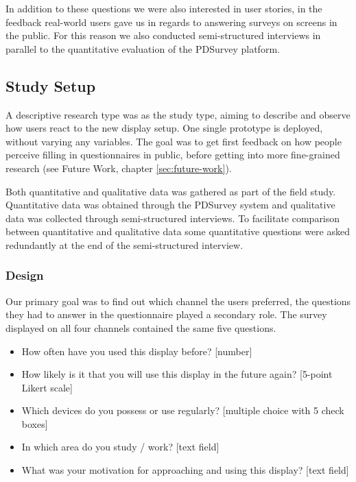 	In addition to these questions we were also interested in user stories, in the feedback real-world users gave us in regards to answering surveys on screens in the public. For this reason we also conducted semi-structured interviews in parallel to the quantitative evaluation of the PDSurvey platform.




\subsection{Study Setup}
	A descriptive research type was as the study type, aiming to describe and observe how users react to the new display setup. One single prototype is deployed, without varying any variables. The goal was to get first feedback on how people perceive filling in questionnaires in public, before getting into more fine-grained research (see Future Work, chapter \ref{sec:future-work}).

	Both quantitative and qualitative data was gathered as part of the field study. Quantitative data was obtained through the PDSurvey system and qualitative data was collected through semi-structured interviews. To facilitate comparison between quantitative and qualitative data some quantitative questions were asked redundantly at the end of the semi-structured interview.




	\subsubsection{Design}

	Our primary goal was to find out which channel the users preferred, the questions they had to answer in the questionnaire played a secondary role. The survey displayed on all four channels contained the same five questions. 

	\begin{itemize}
	\item How often have you used this display before? [number]
	\item How likely is it that you will use this display in the future again? [5-point Likert scale]
	\item Which devices do you possess or use regularly? [multiple choice with 5 check boxes]
	\item In which area do you study / work? [text field]
	\item What was your motivation for approaching and using this display? [text field]
	\end{itemize}

